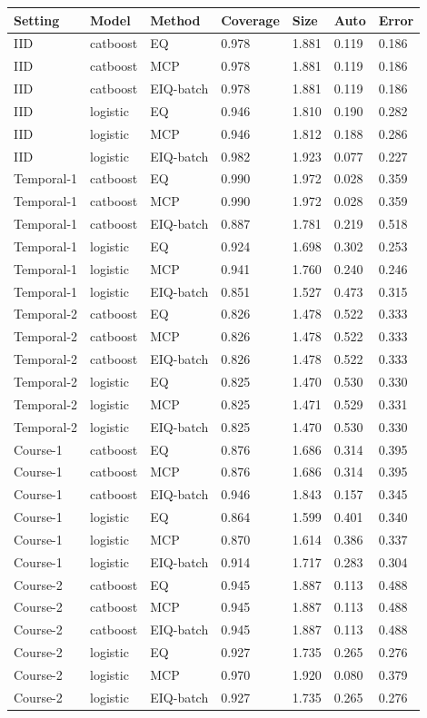 \begin{tabular}{lllllll}
\toprule
Setting & Model & Method & Coverage & Size & Auto & Error\\
\midrule
IID & catboost & EQ & 0.978 & 1.881 & 0.119 & 0.186\\
IID & catboost & MCP & 0.978 & 1.881 & 0.119 & 0.186\\
IID & catboost & EIQ-batch & 0.978 & 1.881 & 0.119 & 0.186\\
IID & logistic & EQ & 0.946 & 1.810 & 0.190 & 0.282\\
IID & logistic & MCP & 0.946 & 1.812 & 0.188 & 0.286\\
IID & logistic & EIQ-batch & 0.982 & 1.923 & 0.077 & 0.227\\
Temporal-1 & catboost & EQ & 0.990 & 1.972 & 0.028 & 0.359\\
Temporal-1 & catboost & MCP & 0.990 & 1.972 & 0.028 & 0.359\\
Temporal-1 & catboost & EIQ-batch & 0.887 & 1.781 & 0.219 & 0.518\\
Temporal-1 & logistic & EQ & 0.924 & 1.698 & 0.302 & 0.253\\
Temporal-1 & logistic & MCP & 0.941 & 1.760 & 0.240 & 0.246\\
Temporal-1 & logistic & EIQ-batch & 0.851 & 1.527 & 0.473 & 0.315\\
Temporal-2 & catboost & EQ & 0.826 & 1.478 & 0.522 & 0.333\\
Temporal-2 & catboost & MCP & 0.826 & 1.478 & 0.522 & 0.333\\
Temporal-2 & catboost & EIQ-batch & 0.826 & 1.478 & 0.522 & 0.333\\
Temporal-2 & logistic & EQ & 0.825 & 1.470 & 0.530 & 0.330\\
Temporal-2 & logistic & MCP & 0.825 & 1.471 & 0.529 & 0.331\\
Temporal-2 & logistic & EIQ-batch & 0.825 & 1.470 & 0.530 & 0.330\\
Course-1 & catboost & EQ & 0.876 & 1.686 & 0.314 & 0.395\\
Course-1 & catboost & MCP & 0.876 & 1.686 & 0.314 & 0.395\\
Course-1 & catboost & EIQ-batch & 0.946 & 1.843 & 0.157 & 0.345\\
Course-1 & logistic & EQ & 0.864 & 1.599 & 0.401 & 0.340\\
Course-1 & logistic & MCP & 0.870 & 1.614 & 0.386 & 0.337\\
Course-1 & logistic & EIQ-batch & 0.914 & 1.717 & 0.283 & 0.304\\
Course-2 & catboost & EQ & 0.945 & 1.887 & 0.113 & 0.488\\
Course-2 & catboost & MCP & 0.945 & 1.887 & 0.113 & 0.488\\
Course-2 & catboost & EIQ-batch & 0.945 & 1.887 & 0.113 & 0.488\\
Course-2 & logistic & EQ & 0.927 & 1.735 & 0.265 & 0.276\\
Course-2 & logistic & MCP & 0.970 & 1.920 & 0.080 & 0.379\\
Course-2 & logistic & EIQ-batch & 0.927 & 1.735 & 0.265 & 0.276\\
\bottomrule
\end{tabular}